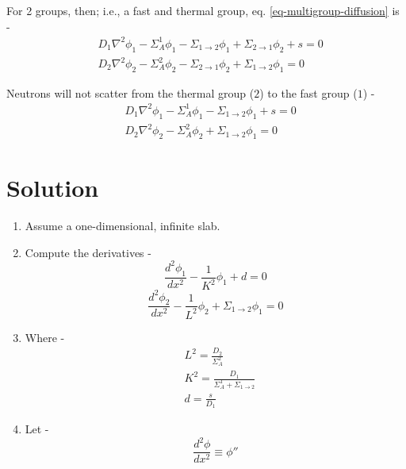 \documentclass[11pt,a4paper]{article}
\begin{document}
\noindent For 2 groups, then; i.e., a fast and thermal group, eq. \ref{eq-multigroup-diffusion} is - 
\begin{equation}
    \begin{split}
        & D_1\nabla^2{\phi_1}-\Sigma_A^1\phi_1-\Sigma_{1 \rightarrow 2}\phi_1+\Sigma_{2 \rightarrow 1}\phi_2+s=0 \\
        & D_2\nabla^2{\phi_2}-\Sigma_A^2\phi_2-\Sigma_{2 \rightarrow 1}\phi_2+\Sigma_{1 \rightarrow 2}\phi_1=0
    \end{split}
\end{equation}

\noindent Neutrons will not scatter from the thermal group ($2$) to the fast group ($1$) - 
\begin{equation}
    \begin{split}
        & D_1\nabla^2{\phi_1}-\Sigma_A^1\phi_1-\Sigma_{1 \rightarrow 2}\phi_1+s=0 \\
        & D_2\nabla^2{\phi_2}-\Sigma_A^2\phi_2+\Sigma_{1 \rightarrow 2}\phi_1=0
    \end{split}
\end{equation}

\section{Solution}
\begin{enumerate}[leftmargin=*,topsep=0pt]
    \item Assume a one-dimensional, infinite slab.
    \item Compute the derivatives - 
        \begin{equation} \label{eq-fast-diffusion}
            \frac{d^2\phi_1}{dx^2}-\frac{1}{K^2}\phi_1+d=0 
        \end{equation}
        \begin{equation} \label{eq-thermal-diffusion}
            \frac{d^2\phi_2}{dx^2}-\frac{1}{L^2}\phi_2+\Sigma_{1 \rightarrow 2}\phi_1=0
        \end{equation}
    \item[] Where - 
        \begin{equation*}
            \begin{split}
                & L^2=\frac{D_2}{\Sigma_A^2} \\
                & K^2=\frac{D_1}{\Sigma_A^1+\Sigma_{1\rightarrow 2}} \\
                & d=\frac{s}{D_1}
            \end{split}
        \end{equation*}
    \item[] Let - 
        \begin{equation*}
            \frac{d^2\phi}{dx^2} \equiv \phi''
        \end{equation*}
\end{enumerate}
\end{document}
